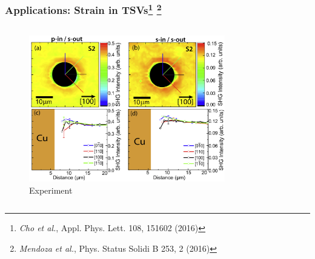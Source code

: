 \documentclass{beamer}
\begin{document}

\begin{frame}
\frametitle{Applications: Strain in TSVs\footnote{\emph{Cho et al.}, Appl. Phys. Lett. 108, 151602 (2016)} \footnote{\emph{Mendoza et al.}, Phys. Status Solidi B 253, 2 (2016)}}
\begin{columns}
\begin{figure}
\centering
\includegraphics[width=\textwidth]{image-yojin}
\vspace*{0.5cm}
\caption{Experiment}
\end{figure}
\begin{figure}
\centering

\end{figure}
\end{columns}
\end{frame}
\end{document}

